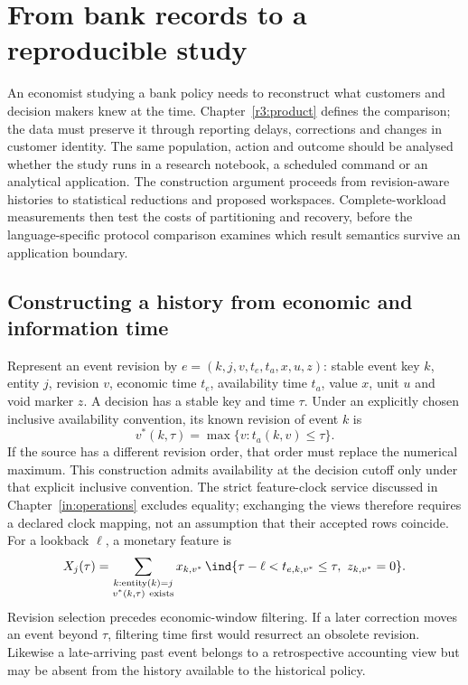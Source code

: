 \chapter{From bank records to a reproducible study}
\label{r3:construction}

An economist studying a bank policy needs to reconstruct what customers
and decision makers knew at the time. Chapter~\ref{r3:product} defines the
comparison; the data must preserve it through reporting delays, corrections
and changes in customer identity. The same population, action and outcome
should be analysed whether the study runs in a research notebook, a scheduled
command or an analytical application. The construction argument proceeds from revision-aware histories to statistical reductions and proposed workspaces. Complete-workload measurements then test the costs of partitioning and recovery, before the language-specific protocol comparison examines which result semantics survive an application boundary.

\section{Constructing a history from economic and information time}
\label{r3:history-construction}

Represent an event revision by
$e=(k,j,v,t_e,t_a,x,u,z)$: stable event key $k$, entity $j$, revision $v$,
economic time $t_e$, availability time $t_a$, value $x$, unit $u$ and
void marker $z$. A decision has a stable key and time $\tau$.
Under an explicitly chosen inclusive availability convention, its known
revision of event $k$ is
\[
 v^*(k,\tau)=\max\{v:t_a(k,v)\le\tau\}.
\]
If the source has a different revision order, that order must replace
the numerical maximum. This construction admits availability at the decision cutoff only under that explicit inclusive convention. The strict feature-clock service discussed in Chapter~\ref{in:operations} excludes equality; exchanging the views therefore requires a declared clock mapping, not an assumption that their accepted rows coincide. For a lookback $\ell$, a monetary feature is
\begin{equation}
 X_j(\tau)=
 \sum_{\substack{k:\operatorname{entity}(k)=j\\v^*(k,\tau)\ {\rm exists}}}
 x_{k,v^*}\,
 \ind\{\tau-\ell<t_{e,k,v^*}\le\tau,\ z_{k,v^*}=0\}.
 \label{r3:revision-feature}
\end{equation}
Revision selection precedes economic-window filtering. If a later
correction moves an event beyond $\tau$, filtering time first would
resurrect an obsolete revision. Likewise a late-arriving past event
belongs to a retrospective accounting view but may be absent from the
history available to the historical policy.

